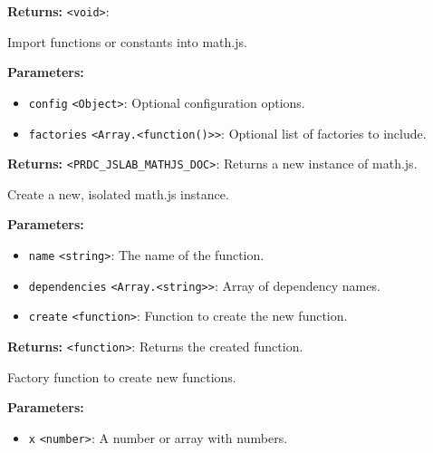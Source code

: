 \documentclass[12pt,a4paper]{article}
\begin{document}
\noindent \textbf{Returns:} \texttt{<void>}: 

\noindent Import functions or constants into math.js.

\vspace{5mm}
\noindent {}


\noindent \textbf{Parameters:}
\begin{itemize}
  \item \texttt{config} \texttt{<Object>}: Optional configuration options.
  \item \texttt{factories} \texttt{<Array.<function()>>}: Optional list of factories to include.
\end{itemize}

\noindent \textbf{Returns:} \texttt{<PRDC\_JSLAB\_MATHJS\_DOC>}: Returns a new instance of math.js.

\noindent Create a new, isolated math.js instance.

\vspace{5mm}
\noindent {}


\noindent \textbf{Parameters:}
\begin{itemize}
  \item \texttt{name} \texttt{<string>}: The name of the function.
  \item \texttt{dependencies} \texttt{<Array.<string>>}: Array of dependency names.
  \item \texttt{create} \texttt{<function>}: Function to create the new function.
\end{itemize}

\noindent \textbf{Returns:} \texttt{<function>}: Returns the created function.

\noindent Factory function to create new functions.

\vspace{5mm}
\noindent {}


\noindent \textbf{Parameters:}
\begin{itemize}
  \item \texttt{x} \texttt{<number>}: A number or array with numbers.
\end{itemize}
\end{document}
